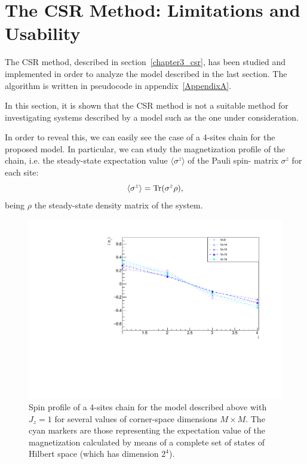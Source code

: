 \section{The CSR Method: Limitations and Usability}
The CSR method, described in section~\ref{chapter3_csr}, has been studied and implemented in order to analyze the model described in the last section. The algorithm is written in pseudocode in appendix~\ref{AppendixA}.

In this section, it is shown that the CSR method is not a suitable method for investigating systems described by a model such as the one under consideration.

In order to reveal this, we can easily see the case of a 4-sites chain for the proposed model. In particular, we can study the magnetization profile of the chain, i.e. the steady-state expectation value $\langle \sigma^z \rangle$ of the Pauli spin- matrix $\sigma^z$ for each site:
\begin{equation*}
    \langle \sigma^z \rangle = \operatorname{Tr}(\sigma^z \rho),
\end{equation*}
being $\rho$ the steady-state density matrix of the system.

\begin{figure}[H]
    \centering
    \includegraphics[scale=0.7]{Figures/4sites/4sites_LM_convergenceIncreasingM.pdf}
    \caption{Spin profile of a 4-sites chain for the model described above with $J_z=1$ for several values of corner-space dimensions $M \times M$. The cyan markers are those representing the expectation value of the magnetization calculated by means of a complete set of states of Hilbert space (which has dimension $2^4$).}
    \label{fig:4sites_LM_convergenceIncreasingM}
\end{figure}

